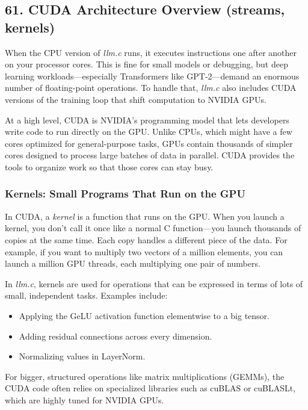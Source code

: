 \documentclass[
  letterpaper,
  DIV=11,
  numbers=noendperiod]{scrreprt}
\providecommand{\tightlist}{%
  \setlength{\itemsep}{0pt}\setlength{\parskip}{0pt}}
\begin{document}
\subsection{61. CUDA Architecture Overview (streams,
kernels)}\label{cuda-architecture-overview-streams-kernels}

When the CPU version of \emph{llm.c} runs, it executes instructions one
after another on your processor cores. This is fine for small models or
debugging, but deep learning workloads---especially Transformers like
GPT-2---demand an enormous number of floating-point operations. To
handle that, \emph{llm.c} also includes CUDA versions of the training
loop that shift computation to NVIDIA GPUs.

At a high level, CUDA is NVIDIA's programming model that lets developers
write code to run directly on the GPU. Unlike CPUs, which might have a
few cores optimized for general-purpose tasks, GPUs contain thousands of
simpler cores designed to process large batches of data in parallel.
CUDA provides the tools to organize work so that those cores can stay
busy.

\subsubsection{Kernels: Small Programs That Run on the
GPU}\label{kernels-small-programs-that-run-on-the-gpu}

In CUDA, a \emph{kernel} is a function that runs on the GPU. When you
launch a kernel, you don't call it once like a normal C function---you
launch thousands of copies at the same time. Each copy handles a
different piece of the data. For example, if you want to multiply two
vectors of a million elements, you can launch a million GPU threads,
each multiplying one pair of numbers.

In \emph{llm.c}, kernels are used for operations that can be expressed
in terms of lots of small, independent tasks. Examples include:

\begin{itemize}
\tightlist
\item
  Applying the GeLU activation function elementwise to a big tensor.
\item
  Adding residual connections across every dimension.
\item
  Normalizing values in LayerNorm.
\end{itemize}

For bigger, structured operations like matrix multiplications (GEMMs),
the CUDA code often relies on specialized libraries such as cuBLAS or
cuBLASLt, which are highly tuned for NVIDIA GPUs.
\end{document}
